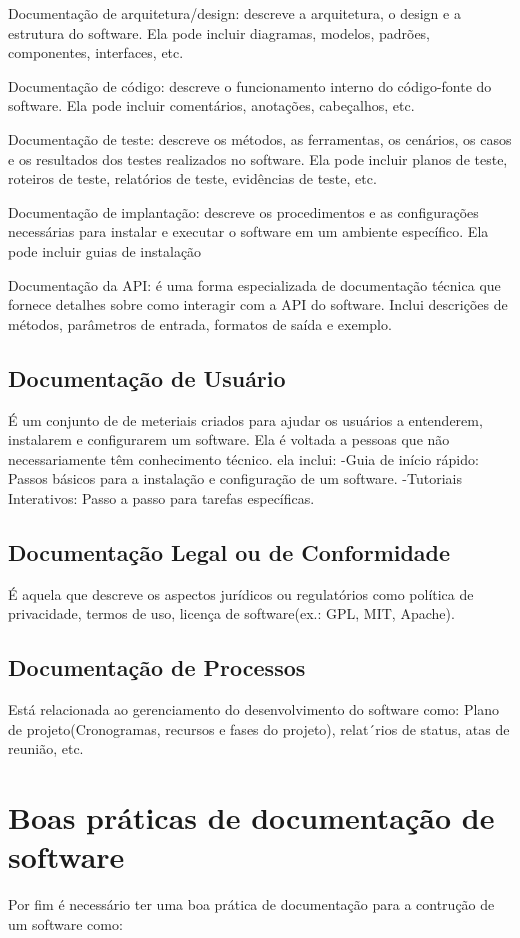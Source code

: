 \documentclass[12pt,oneside,a4paper,article]{abntex2}
\begin{document}
Documentação de arquitetura/design: descreve a arquitetura, o design e a estrutura do software. Ela pode
incluir diagramas, modelos, padrões, componentes, interfaces, etc.


Documentação de código: descreve o funcionamento interno do código-fonte do software. Ela
pode incluir comentários, anotações, cabeçalhos, etc.


Documentação de teste: descreve os métodos, as ferramentas, os cenários, os casos e os resultados
dos testes realizados no software. Ela pode incluir planos de teste, roteiros de teste, relatórios de
teste, evidências de teste, etc.


Documentação de implantação: descreve os procedimentos e as configurações necessárias para
instalar e executar o software em um ambiente específico. Ela pode incluir guias de instalação

Documentação da API: é uma forma especializada de documentação
técnica que fornece detalhes sobre como interagir com a API do software. Inclui descrições de
métodos, parâmetros de entrada, formatos de saída e exemplo.

\subsection{Documentação de Usuário}
É um conjunto de de meteriais criados para ajudar os
usuários a entenderem, instalarem e configurarem um software. Ela é voltada a pessoas
que não necessariamente têm conhecimento técnico. ela inclui:
-Guia de início rápido: Passos básicos para a instalação e configuração de um software.
-Tutoriais Interativos: Passo a passo para tarefas específicas.

\subsection{Documentação Legal ou de Conformidade}
É aquela que descreve os aspectos jurídicos ou regulatórios como política de privacidade, termos de uso, licença de software(ex.: GPL, MIT, Apache).


\subsection{Documentação de Processos}
Está relacionada ao gerenciamento do desenvolvimento do software como: Plano de projeto(Cronogramas, recursos e fases do projeto), relat´rios de status, atas de reunião, etc.

\section{Boas práticas de documentação de software}
Por fim é necessário ter uma boa prática de documentação para a contrução de um software como:
\end{document}

